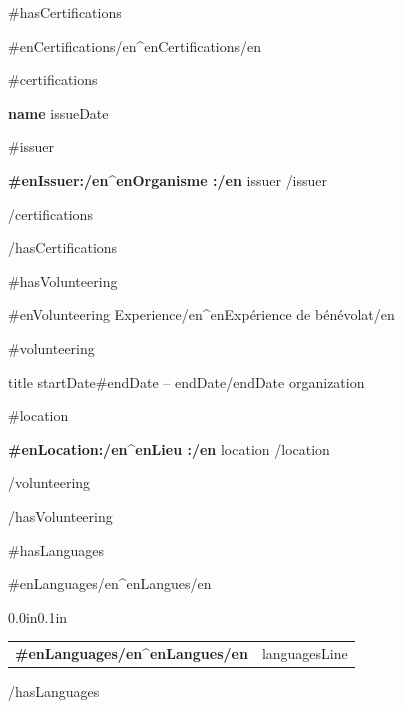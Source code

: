 \documentclass{resume}
\makeatletter
\newcommand{\plainitem}[1]{\item{#1}}
\newcommand{\entry}[2]{#1 & #2 \tabularnewline}
\newcommand{\tableEnv}[2]{%
  \begin{rSection}{#1}
    \begin{adjustwidth}{0.0in}{0.1in}
      \begin{tabularx}{\linewidth}{@{} >{\bfseries}l @{\hspace{6ex}} X @{}}
        #2
      \end{tabularx}
    \end{adjustwidth}
  \end{rSection}
}
\makeatother
\begin{document}
{{#hasCertifications}}
\begin{rSection}{ {{#en}}Certifications{{/en}}{{^en}}Certifications{{/en}} }

{{#certifications}}

\begin{rSubsectionNoBullet}{\bf {{{name}}}}{ {{{issueDate}}} }{}{}

    {{#issuer}}
    \plainitem{\textbf{ {{#en}}Issuer:{{/en}}{{^en}}Organisme :{{/en}} } {{{issuer}}}}
    {{/issuer}}

\end{rSubsectionNoBullet}

{{/certifications}}

\end{rSection}
{{/hasCertifications}}


{{#hasVolunteering}}
\begin{rSection}{ {{#en}}Volunteering Experience{{/en}}{{^en}}Expérience de bénévolat{{/en}} }

{{#volunteering}}

\begin{rSubsectionNoBullet}{ {{{title}}} }{ {{{startDate}}}{{#endDate}} -- {{{endDate}}}{{/endDate}} }{ {{{organization}}} }{}

    {{#location}}
    \plainitem{\textbf{ {{#en}}Location:{{/en}}{{^en}}Lieu :{{/en}} } {{{location}}}}
    {{/location}}

\end{rSubsectionNoBullet}

{{/volunteering}}

\end{rSection}
{{/hasVolunteering}}


{{#hasLanguages}}
\tableEnv{ {{#en}}Languages{{/en}}{{^en}}Langues{{/en}} }{
    \entry{ {{#en}}Languages{{/en}}{{^en}}Langues{{/en}} }{ {{{languagesLine}}} }
}
{{/hasLanguages}}

\end{document}
